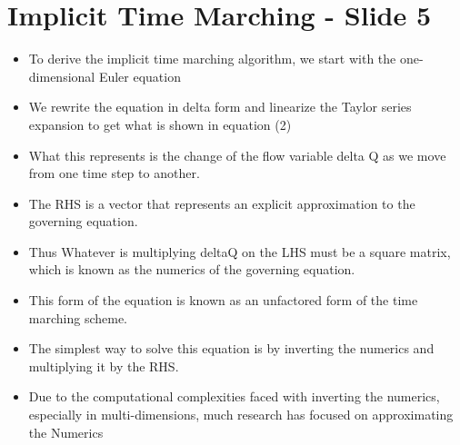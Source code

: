 \documentclass[a4paper,17pt]{extarticle}
\begin{document}
\pagebreak \section*{Implicit Time Marching - Slide 5}
\begin{itemize}
   \item To derive the implicit time marching algorithm, we start with the  one-dimensional Euler
      equation
   \item We rewrite the equation in delta form and linearize the Taylor series expansion to get
         what is shown in equation (2)
   \item What this represents is the change of the flow variable {delta Q} as we move from 
         one time step to another.
   \item The RHS is a vector that represents an explicit approximation to the governing equation.
   \item Thus Whatever is multiplying deltaQ on the LHS must be a square matrix, which is known as 
         the numerics of the governing equation.
   \item This form of the equation is known as an unfactored form of the time marching scheme.
   \item The simplest way to solve this equation is by inverting the numerics and multiplying it by
         the RHS. 
   \item Due to the computational complexities faced with inverting the numerics, especially in 
         multi-dimensions, much research has focused on approximating the Numerics
\end{itemize}
\end{document}
